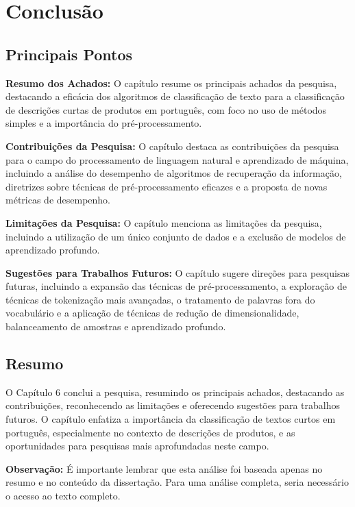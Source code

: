 \documentclass{report}
\begin{document}
\chapter{Conclusão}

\section*{Principais Pontos}

\textbf{Resumo dos Achados:} O capítulo resume os principais achados da pesquisa, destacando a eficácia dos algoritmos de classificação de texto para a classificação de descrições curtas de produtos em português, com foco no uso de métodos simples e a importância do pré-processamento.

\textbf{Contribuições da Pesquisa:} O capítulo destaca as contribuições da pesquisa para o campo do processamento de linguagem natural e aprendizado de máquina, incluindo a análise do desempenho de algoritmos de recuperação da informação, diretrizes sobre técnicas de pré-processamento eficazes e a proposta de novas métricas de desempenho.

\textbf{Limitações da Pesquisa:} O capítulo menciona as limitações da pesquisa, incluindo a utilização de um único conjunto de dados e a exclusão de modelos de aprendizado profundo.

\textbf{Sugestões para Trabalhos Futuros:} O capítulo sugere direções para pesquisas futuras, incluindo a expansão das técnicas de pré-processamento, a exploração de técnicas de tokenização mais avançadas, o tratamento de palavras fora do vocabulário e a aplicação de técnicas de redução de dimensionalidade, balanceamento de amostras e aprendizado profundo.

\section*{Resumo}

O Capítulo 6 conclui a pesquisa, resumindo os principais achados, destacando as contribuições, reconhecendo as limitações e oferecendo sugestões para trabalhos futuros. O capítulo enfatiza a importância da classificação de textos curtos em português, especialmente no contexto de descrições de produtos, e as oportunidades para pesquisas mais aprofundadas neste campo.

\textbf{Observação:} É importante lembrar que esta análise foi baseada apenas no resumo e no conteúdo da dissertação. Para uma análise completa, seria necessário o acesso ao texto completo.
\end{document}

